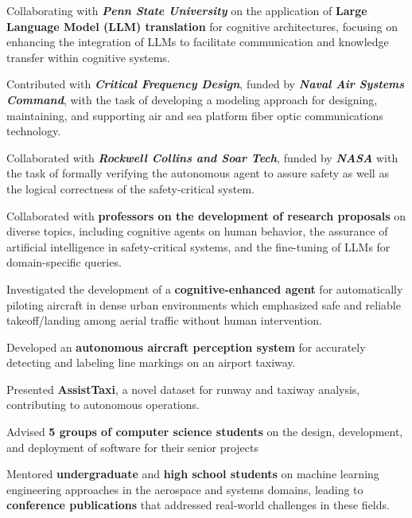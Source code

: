 \begin{cventries}
{\begin{cvitems}
\item Collaborating with \textit{\textbf{Penn State University}} on the application of \textbf{Large Language Model (LLM) translation} for cognitive architectures, focusing on enhancing the integration of LLMs to facilitate communication and knowledge transfer within cognitive systems.
\item Contributed with \textit{\textbf{Critical Frequency Design}}, funded by \textit{\textbf{Naval Air Systems Command}}, with the task of developing a modeling approach for designing, maintaining, and supporting air and sea platform fiber optic communications technology.
\item Collaborated with \textit{\textbf{Rockwell Collins and Soar Tech}}, funded by \textit{\textbf{NASA}} with the task of formally verifying the autonomous agent to assure safety as well as the logical correctness of the safety-critical system.
\item Collaborated with \textbf{professors on the development of research proposals} on diverse topics, including cognitive agents on human behavior, the assurance of artificial intelligence in safety-critical systems, and the fine-tuning of LLMs for domain-specific queries.
\item Investigated the development of a \textbf{cognitive-enhanced agent} for automatically piloting aircraft in dense urban environments which emphasized safe and reliable takeoff/landing among aerial traffic without human intervention.
\item Developed an \textbf{autonomous aircraft perception system} for accurately detecting and labeling line markings on an airport taxiway.
\item Presented \textbf{AssistTaxi}, a novel dataset for runway and taxiway analysis, contributing to autonomous operations.
\item Advised \textbf{5 groups of computer science students} on the design, development, and deployment of software for their senior projects
\item Mentored \textbf{undergraduate} and \textbf{high school students} on machine learning engineering approaches in the aerospace and systems domains, leading to \textbf{conference publications} that addressed real-world challenges in these fields.

\end{cvitems}}
\end{cventries}
